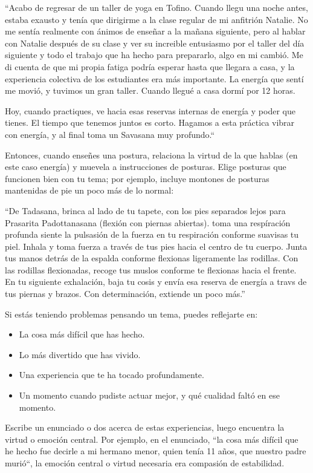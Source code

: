 ``Acabo de regresar de un taller de yoga en Tofino. Cuando llegu una noche antes, estaba exausto y tenía que dirigirme a la clase regular de mi anfitrión Natalie. No me sentía realmente con ánimos de enseñar a la mañana siguiente, pero al hablar con Natalie despu\'es de su clase y ver su increible entusiasmo por el taller del día siguiente y todo el trabajo que ha hecho para prepararlo, algo en mi cambió. Me di cuenta de que mi propia fatiga podría esperar hasta que llegara a casa, y la experiencia colectiva de los estudiantes era más importante. La energía que sentí me movió, y tuvimos un gran taller. Cuando llegu\'e a casa dormí por 12 horas.

Hoy, cuando practiques, ve hacia esas reservas internas de energía y poder que tienes. El tiempo que tenemos juntos es corto. Hagamos a esta práctica vibrar con energía, y al final toma un Savasana muy profundo.``

Entonces, cuando enseñes una postura, relaciona la virtud de la que hablas (en este caso energía) y muevela a instrucciones de posturas. Elige posturas que funcionen bien con tu tema; por ejemplo, incluye montones de posturas mantenidas de pie un poco más de lo normal:

``De Tadasana, brinca al lado de tu tapete, con los pies separados lejos para Prasarita Padottanasana (flexión con piernas abiertas). toma una respíración profunda  siente la pulsasión de la fuerza en tu respiración conforme suavisas tu piel. Inhala y toma fuerza a trav\'es de tus pies hacia el centro de tu cuerpo. Junta tus manos detrás de la espalda conforme flexionas ligeramente las rodillas. Con las rodillas flexionadas, recoge tus muslos conforme te flexionas hacia el frente. En tu siguiente exhalación, baja tu cosis y envía esa reserva de energía a travs de tus piernas y brazos. Con determinación, extiende un poco más.''

Si estás teniendo problemas pensando un tema, puedes reflejarte en:
\begin{itemize}
	\item La cosa más difícil que has hecho.
	\item Lo más divertido que has vivido.
	\item Una experiencia que te ha tocado profundamente.
	\item Un momento cuando pudiste actuar mejor, y qu\'e cualidad faltó en ese momento.
\end{itemize}

Escribe un enunciado o dos acerca de estas experiencias, luego encuentra la virtud o emoción central. Por ejemplo, en el enunciado, ``la cosa más difícil que he hecho fue decirle a mi hermano menor, quien tenía 11 años, que nuestro padre murió``, la emoción central o virtud necesaria era compasión de estabilidad.

